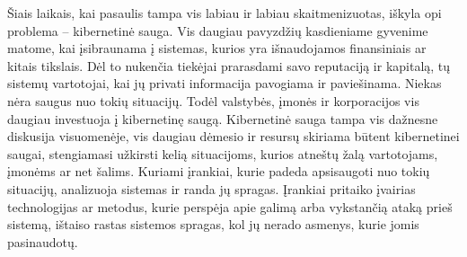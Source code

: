 Šiais laikais, kai pasaulis tampa vis labiau ir labiau skaitmenizuotas, iškyla opi problema – kibernetinė sauga. Vis daugiau pavyzdžių kasdieniame gyvenime matome, kai įsibraunama į sistemas, kurios yra
išnaudojamos finansiniais ar kitais tikslais. Dėl to nukenčia tiekėjai prarasdami savo reputaciją ir kapitalą, tų sistemų
vartotojai, kai jų privati informacija pavogiama ir paviešinama. Niekas nėra saugus nuo tokių situacijų. Todėl valstybės, įmonės ir korporacijos vis daugiau investuoja
į kibernetinę saugą. Kibernetinė sauga tampa vis dažnesne diskusija visuomenėje, vis daugiau
dėmesio ir resursų skiriama būtent kibernetinei saugai, stengiamasi užkirsti kelią situacijoms, kurios atneštų žalą vartotojams, įmonėms ar net šalims. Kuriami
įrankiai, kurie padeda apsisaugoti nuo tokių situacijų, analizuoja sistemas ir randa jų spragas. Įrankiai pritaiko įvairias technologijas ar metodus,
kurie perspėja apie galimą arba vykstančią ataką prieš sistemą, ištaiso rastas sistemos spragas, kol jų nerado asmenys, kurie jomis pasinaudotų.